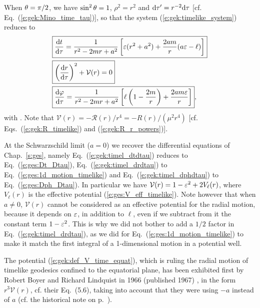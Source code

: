 When $\theta=\pi/2$, we have $\sin^2\theta=1$, $\rho^2 = r^2$ and $\mathrm{d}\tau' = r^{-2}\mathrm{d}\tau$
[cf. Eq.~(\ref{e:gek:Mino_time_tau})], so that the system
(\ref{e:gek:timelike_system}) reduces to
\begin{subequations}
\label{e:gek:equat_time_system}
\begin{align}
& \fbox{$\displaystyle  \frac{\mathrm{d} t}{\mathrm{d}\tau} = \frac{1}{r^2 - 2 m r + a^2} \left[
    \varepsilon(r^2 + a^2) + \frac{2 a m}{r} (a\varepsilon - \ell) \right] $} \label{e:gek:timel_dtdtau} \\
& \fbox{$\displaystyle  \left( \frac{\mathrm{d} r}{\mathrm{d} \tau} \right) ^2 + \mathcal{V}(r) = 0 $}\label{e:gek:timel_drdtau} \\
& \fbox{$\displaystyle  \frac{\mathrm{d}\varphi}{\mathrm{d}\tau} = \frac{1}{r^2 - 2 m r + a^2} \left[
    \ell \left( 1 - \frac{2m}{r} \right)
    + \frac{2 am \varepsilon}{r} \right] $},  \label{e:gek:timel_dphdtau}
\end{align}
\end{subequations}
with
\be \label{e:gek:def_V_time_equat}
   .
\ee
Note that $\mathcal{V}(r) = - \mathcal{R}(r)/r^4 = - R(r) / (\mu^2 r^4)$ [cf. Eqs.~(\ref{e:gek:R_timelike}) and (\ref{e:gek:R_r_powers})].
\begin{remark}
At the Schwarzschild limit ($a=0$) we recover the differential equations of Chap.~\ref{s:ges},
namely Eq.~(\ref{e:gek:timel_dtdtau}) reduces to Eq.~(\ref{e:ges:Dt_Dtau}),
Eq.~(\ref{e:gek:timel_drdtau}) to Eq.~(\ref{e:ges:1d_motion_timelike}) and
Eq.~(\ref{e:gek:timel_dphdtau}) to Eq.~(\ref{e:ges:Dph_Dtau}). In particular
we have $\mathcal{V}(r) = 1 - \varepsilon^2 + 2 V_\ell(r)$, where $V_\ell(r)$
is the effective potential (\ref{e:ges:V_eff_timelike}). Note however that
when $a\neq 0$, $\mathcal{V}(r)$ cannot be considered as an effective
potential for the radial motion, because it depends on $\varepsilon$, in addition
to $\ell$, even if we subtract from it the constant term $1 - \varepsilon^2$.
This is why we did not bother to add a $1/2$ factor in Eq.~(\ref{e:gek:timel_drdtau}),
as we did for Eq.~(\ref{e:ges:1d_motion_timelike}) to make it match
the first integral of a 1-dimensional motion in a potential well.
\end{remark}

\begin{hist}
The potential (\ref{e:gek:def_V_time_equat}), which is ruling the radial motion
of timelike geodesics confined to the equatorial plane, has been exhibited first
by Robert Boyer and Richard Lindquist
in 1966 (published 1967) \cite{BoyerL67}, in the form $r^3  \mathcal{V}(r)$,
cf. their Eq.~(5.6), taking into account that they were using $-a$ instead of $a$
(cf. the historical note on p.~\pageref{h:ker:coord_ti}).
\end{hist}

